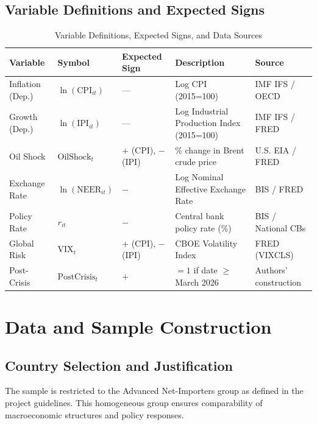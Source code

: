 \documentclass[11pt,a4paper]{article}
\let\oldsection\section
\renewcommand{\section}{\Needspace{6\baselineskip}\oldsection}
\begin{document}
\subsection{Variable Definitions and Expected Signs}
\begin{table}[H]
\caption{Variable Definitions, Expected Signs, and Data Sources}
\centering\small
\begin{tabular}{|p{2.6cm}|p{2.1cm}|p{1.7cm}|p{4.8cm}|p{2.5cm}|}
\hline
\textbf{Variable} & \textbf{Symbol} & \textbf{Expected Sign} & \textbf{Description} & \textbf{Source}\\\hline
Inflation (Dep.) & $\ln(\text{CPI}_{it})$ & --- & Log CPI (2015=100) & IMF IFS / OECD\\\hline
Growth (Dep.) & $\ln(\text{IPI}_{it})$ & --- & Log Industrial Production Index (2015=100) & IMF IFS / FRED\\\hline
Oil Shock & $\text{OilShock}_t$ & $+$ (CPI), $-$ (IPI) & \% change in Brent crude price & U.S. EIA / FRED\\\hline
Exchange Rate & $\ln(\text{NEER}_{it})$ & $-$ & Log Nominal Effective Exchange Rate & BIS / FRED\\\hline
Policy Rate & $r_{it}$ & $-$ & Central bank policy rate (\%) & BIS / National CBs\\\hline
Global Risk & $\text{VIX}_t$ & $+$ (CPI), $-$ (IPI) & CBOE Volatility Index & FRED (VIXCLS)\\\hline
Post-Crisis & $\text{PostCrisis}_t$ & $+$ & $=1$ if date $\ge$ March 2026 & Authors' construction\\\hline
\end{tabular}
\end{table}

\section{Data and Sample Construction}
\subsection{Country Selection and Justification}
The sample is restricted to the Advanced Net-Importers group as defined in the project guidelines. This homogeneous group ensures comparability of macroeconomic structures and policy responses.
\end{document}
